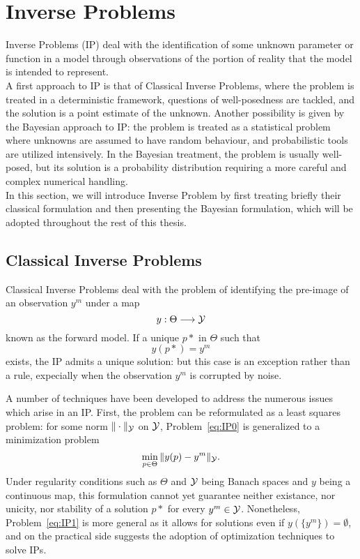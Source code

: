 \section{Inverse Problems} \label{sec:IP}
Inverse Problems (IP) deal with the identification of some unknown parameter or function in a model through observations of the portion of reality that the model is intended to represent. \\
A first approach to IP is that of Classical Inverse Problems, where the problem is treated in a deterministic framework, questions of well-posedness are tackled, and the solution is a point estimate of the unknown.
Another possibility is given by the Bayesian approach to IP: the problem is treated as a statistical problem where unknowns are assumed to have random behaviour, and probabilistic tools are utilized intensively. 
In the Bayesian treatment, the problem is usually well-posed, but its solution is a probability distribution requiring a more careful and complex numerical handling.\\
In this section, we will introduce Inverse Problem by first treating briefly their classical formulation and then presenting the Bayesian formulation, which will be adopted throughout the rest of this thesis.

\subsection{Classical Inverse Problems}\label{sec:CIP}

Classical Inverse Problems deal with the problem of identifying the pre-image of an observation $y^m$ under a map \[y : \Theta \longrightarrow \mathcal Y \] known as the forward model. 
If a unique $p*$ in $\Theta$ such that
\begin{equation}\label{eq:IP0}
    y(p*) = y^m
\end{equation}
exists, the IP admits a unique solution: but this case is an exception rather than a rule, expecially when the observation $y^m$ is corrupted by noise.

A number of techniques have been developed to address the numerous issues which arise in an IP.
First, the problem can be reformulated as a least squares problem: for some norm $\| \cdot \| _\mathcal Y$ on $\mathcal Y$, Problem~\ref{eq:IP0} is generalized to a minimization problem
\begin{equation}\label{eq:IP1}
    \min_{p\in \Theta} \| y(p) - y^m \|_\mathcal Y.
\end{equation}
Under regularity conditions such as $\Theta$ and $\mathcal Y$ being Banach spaces and $y$ being a continuous map, this formulation cannot yet guarantee neither existance, nor unicity, nor stability of a solution $p*$ for every $y^m \in \mathcal Y$. Nonetheless, Problem~\ref{eq:IP1} is more general as it allows for solutions even if $y(\{y^m\} )= \emptyset$, and on the practical side suggests the adoption of optimization techniques to solve IPs.

